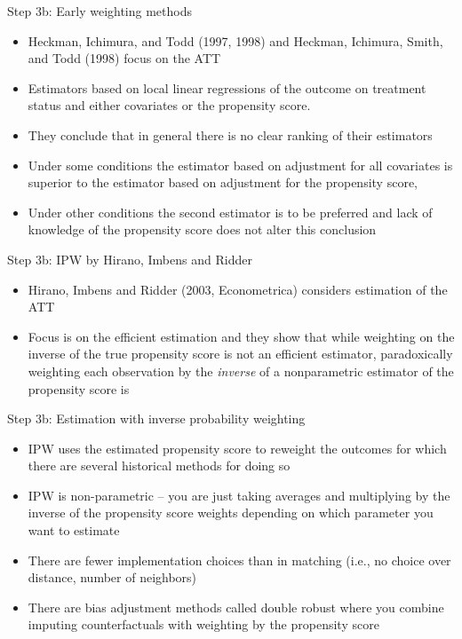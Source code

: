 \documentclass{beamer}
\begin{document}
\begin{frame}{Step 3b: Early weighting methods}

\begin{itemize} 
\item Heckman, Ichimura, and Todd (1997, 1998) and Heckman, Ichimura, Smith,
and Todd (1998) focus on the ATT
\item Estimators based on local linear regressions of the outcome on treatment status and either covariates or the propensity score. 
\item They conclude that in general there is no clear ranking of their estimators 
\item Under some conditions the estimator based on adjustment for all covariates is superior to the estimator based on adjustment for the propensity score, \item Under other conditions the second estimator is to be preferred and lack of knowledge of the propensity score does not alter this conclusion
\end{itemize}

\end{frame}

	

\begin{frame}{Step 3b: IPW by Hirano, Imbens and Ridder}

\begin{itemize} 
\item Hirano, Imbens and Ridder (2003, Econometrica) considers estimation of the ATT
\item Focus is on the efficient estimation and they show that while weighting on the inverse of the true propensity score is not an efficient estimator, paradoxically weighting each observation by the \emph{inverse} of a nonparametric estimator of the propensity score is
\end{itemize}

\end{frame}


\begin{frame}{Step 3b: Estimation with inverse probability weighting}

\begin{itemize}
	\item IPW uses the estimated propensity score to reweight the outcomes for which there are several historical methods for doing so
	\item IPW is non-parametric -- you are just taking averages and multiplying by the inverse of the propensity score weights depending on which parameter you want to estimate
	\item There are fewer implementation choices than in matching (i.e., no choice over distance, number of neighbors)
	\item There are bias adjustment methods called double robust where you combine imputing counterfactuals with weighting by the propensity score
\end{itemize}

\end{frame}
	
\end{document}
